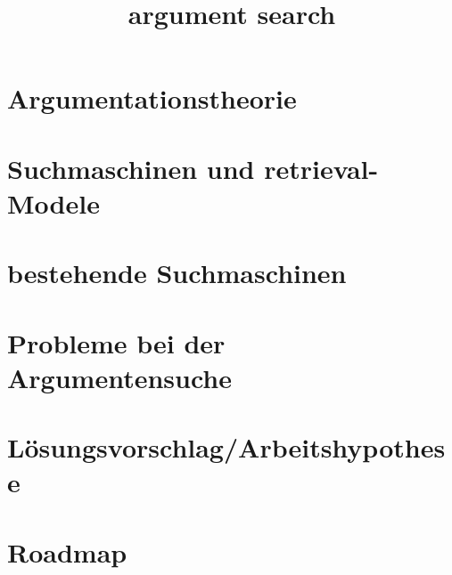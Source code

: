 \documentclass{beamer}
\title{argument search}
\begin{document}
	\begin{frame}
		\tableofcontents
	\end{frame}

	\section{Argumentationstheorie}
	\begin{frame}
	\end{frame}
	\section{Suchmaschinen und retrieval-Modele}
	\section{bestehende Suchmaschinen}
	\section{Probleme bei der Argumentensuche}
	\section{Lösungsvorschlag/Arbeitshypothese}
	\section{Roadmap}
	\begin{frame}
	\end{frame}
\end{document}
